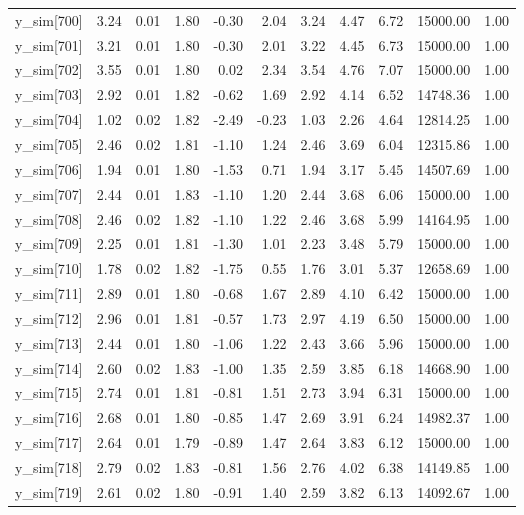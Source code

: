 \begin{table}[ht]
\begin{tabular}{rrrrrrrrrrr}
  y\_sim[700] & 3.24 & 0.01 & 1.80 & -0.30 & 2.04 & 3.24 & 4.47 & 6.72 & 15000.00 & 1.00 \\ 
  y\_sim[701] & 3.21 & 0.01 & 1.80 & -0.30 & 2.01 & 3.22 & 4.45 & 6.73 & 15000.00 & 1.00 \\ 
  y\_sim[702] & 3.55 & 0.01 & 1.80 & 0.02 & 2.34 & 3.54 & 4.76 & 7.07 & 15000.00 & 1.00 \\ 
  y\_sim[703] & 2.92 & 0.01 & 1.82 & -0.62 & 1.69 & 2.92 & 4.14 & 6.52 & 14748.36 & 1.00 \\ 
  y\_sim[704] & 1.02 & 0.02 & 1.82 & -2.49 & -0.23 & 1.03 & 2.26 & 4.64 & 12814.25 & 1.00 \\ 
  y\_sim[705] & 2.46 & 0.02 & 1.81 & -1.10 & 1.24 & 2.46 & 3.69 & 6.04 & 12315.86 & 1.00 \\ 
  y\_sim[706] & 1.94 & 0.01 & 1.80 & -1.53 & 0.71 & 1.94 & 3.17 & 5.45 & 14507.69 & 1.00 \\ 
  y\_sim[707] & 2.44 & 0.01 & 1.83 & -1.10 & 1.20 & 2.44 & 3.68 & 6.06 & 15000.00 & 1.00 \\ 
  y\_sim[708] & 2.46 & 0.02 & 1.82 & -1.10 & 1.22 & 2.46 & 3.68 & 5.99 & 14164.95 & 1.00 \\ 
  y\_sim[709] & 2.25 & 0.01 & 1.81 & -1.30 & 1.01 & 2.23 & 3.48 & 5.79 & 15000.00 & 1.00 \\ 
  y\_sim[710] & 1.78 & 0.02 & 1.82 & -1.75 & 0.55 & 1.76 & 3.01 & 5.37 & 12658.69 & 1.00 \\ 
  y\_sim[711] & 2.89 & 0.01 & 1.80 & -0.68 & 1.67 & 2.89 & 4.10 & 6.42 & 15000.00 & 1.00 \\ 
  y\_sim[712] & 2.96 & 0.01 & 1.81 & -0.57 & 1.73 & 2.97 & 4.19 & 6.50 & 15000.00 & 1.00 \\ 
  y\_sim[713] & 2.44 & 0.01 & 1.80 & -1.06 & 1.22 & 2.43 & 3.66 & 5.96 & 15000.00 & 1.00 \\ 
  y\_sim[714] & 2.60 & 0.02 & 1.83 & -1.00 & 1.35 & 2.59 & 3.85 & 6.18 & 14668.90 & 1.00 \\ 
  y\_sim[715] & 2.74 & 0.01 & 1.81 & -0.81 & 1.51 & 2.73 & 3.94 & 6.31 & 15000.00 & 1.00 \\ 
  y\_sim[716] & 2.68 & 0.01 & 1.80 & -0.85 & 1.47 & 2.69 & 3.91 & 6.24 & 14982.37 & 1.00 \\ 
  y\_sim[717] & 2.64 & 0.01 & 1.79 & -0.89 & 1.47 & 2.64 & 3.83 & 6.12 & 15000.00 & 1.00 \\ 
  y\_sim[718] & 2.79 & 0.02 & 1.83 & -0.81 & 1.56 & 2.76 & 4.02 & 6.38 & 14149.85 & 1.00 \\ 
  y\_sim[719] & 2.61 & 0.02 & 1.80 & -0.91 & 1.40 & 2.59 & 3.82 & 6.13 & 14092.67 & 1.00 \\ 

\end{tabular}
\end{table}
